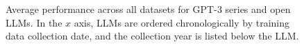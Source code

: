 \documentclass[letterpaper]{article} %
\begin{document}
\begin{figure}[h!]
\begin{subfigure}[b]{0.475\textwidth}
            \label{fig:Open-datasets}
        \end{subfigure}
        \caption[]
        {Average performance across all datasets for GPT-3 series and open LLMs. In the $x$ axis, LLMs are ordered chronologically by training data collection date, and the collection year is listed below the LLM.}
        \label{fig:experiments-average-all}
    \end{figure}


\end{document}
